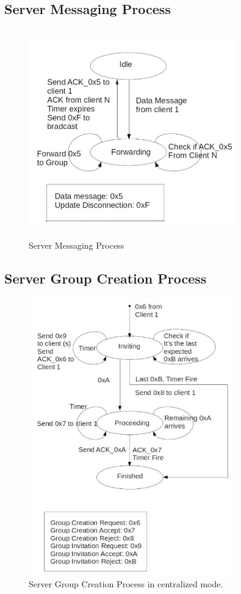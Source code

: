 \documentclass{article}
\begin{document}
\subsection{Server Messaging Process}
\begin{figure}[H]
\centering
\includegraphics[width=9cm, height=9cm]{MessagingFSM.jpg}
\caption{Server Messaging Process}
\label{fig:{MessagingFSM}}
\end{figure}

\subsection{Server Group Creation Process}
\begin{figure}[H]
\centering
\includegraphics[width=9cm, height=12cm]{GroupCreationFSM.jpg}
\caption{Server Group Creation Process in centralized mode.}
\label{fig:GroupCreationFSM}
\end{figure}
\end{document}

